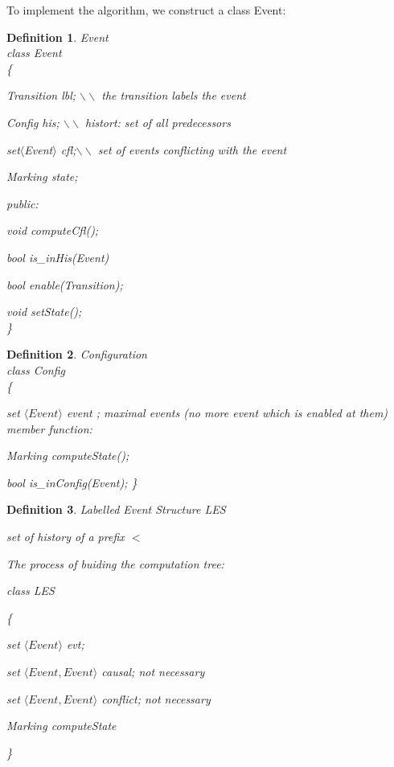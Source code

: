\documentclass[11pt]{article}
\newtheorem{definition}{Definition}
\begin{document}
	
	To implement the algorithm, we construct a class Event:
	
	\begin{definition}{Event\\}
		class Event\\
		\{ 
		
		Transition lbl; 	$\backslash\backslash$ the transition labels the event
		
		Config his; 	$\backslash\backslash$ histort: set of all predecessors
		
		set$\langle$Event$\rangle$ cfl;$\backslash\backslash$ set of events conflicting with the event
		
		Marking state;
		
		\textup{public:}
		
		void computeCfl();
		
		bool is\_inHis(Event)
		
		bool enable(Transition);
		
		void setState();\\	
		\}
	\end{definition}
		
\begin{definition}{Configuration} \\
	class Config\\
	\{
	
		set $\langle Event \rangle$  event ; maximal events (no more event which is enabled at them) \\
		\textup{member function:}
		
		Marking computeState();
		
		bool is\_inConfig(Event);
	\}
\end{definition}

\begin{definition}{Labelled Event Structure LES}

	set of history of a prefix $<$
	
	The process of buiding the computation tree:
	
	class LES
	
	\{
	
		set $\langle Event \rangle$ evt;
		
		set $\langle Event,Event \rangle$ causal; not necessary
		
		set $\langle Event,Event \rangle$ conflict; not necessary
	
		Marking computeState
		
	\}
\end{definition}
\end{document}
